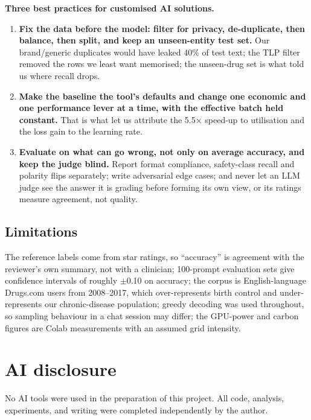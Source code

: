 \documentclass[11pt]{article}
\begin{document}
\textbf{Three best practices for customised AI solutions.}
\begin{enumerate}
\item \textbf{Fix the data before the model: filter for privacy, de-duplicate, then balance, then split, and keep an unseen-entity test set.} Our brand/generic duplicates would have leaked 40\% of test text; the TLP filter removed the rows we least want memorised; the unseen-drug set is what told us where recall drops.
\item \textbf{Make the baseline the tool's defaults and change one economic and one performance lever at a time, with the effective batch held constant.} That is what let us attribute the 5.5$\times$ speed-up to utilisation and the loss gain to the learning rate.
\item \textbf{Evaluate on what can go wrong, not only on average accuracy, and keep the judge blind.} Report format compliance, safety-class recall and polarity flips separately; write adversarial edge cases; and never let an LLM judge see the answer it is grading before forming its own view, or its ratings measure agreement, not quality.
\end{enumerate}

\subsection{Limitations}
The reference labels come from star ratings, so ``accuracy'' is agreement with the reviewer's own summary, not with a clinician; 100-prompt evaluation sets give confidence intervals of roughly $\pm$0.10 on accuracy; the corpus is English-language Drugs.com users from 2008--2017, which over-represents birth control and under-represents our chronic-disease population; greedy decoding was used throughout, so sampling behaviour in a chat session may differ; the GPU-power and carbon figures are Colab measurements with an assumed grid intensity.

\section{AI disclosure}
No AI tools were used in the preparation of this project. All code, analysis, experiments, and writing were completed independently by the author.
\end{document}
